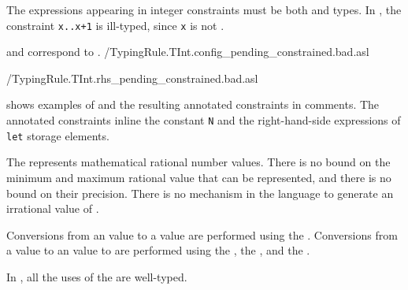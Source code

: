 The expressions appearing in integer constraints must be both
\symbolicallyevaluableterm{} and \constrainedintegerterm{} types.
%
In , the constraint
\verb|x..x+1| is ill-typed, since \texttt{x} is not \symbolicallyevaluableterm{}.

and 
correspond to .
{\typingtests/TypingRule.TInt.config_pending_constrained.bad.asl}

{\typingtests/TypingRule.TInt.rhs_pending_constrained.bad.asl}




 shows examples of \wellconstrainedintegertypesterm{}
and the resulting annotated constraints in comments.
The annotated constraints inline the constant \texttt{N} and the right-hand-side
expressions of \texttt{let} storage elements.



\hypertarget{realtypeterm}{}
The \emph{\realtypeterm{}} represents mathematical rational number values.
There is no bound on the minimum and maximum rational value that can be represented,
and there is no bound on their precision.
%
There is no mechanism in the language to generate an irrational value of \realtypeterm.

Conversions from an \integertypeterm{} value to a \realtypeterm{} value are performed
using the .
%
Conversions from a \realtypeterm{} value to an \integertypeterm{} value to are performed
using the , the , and the .

In , all the uses of the \realtypeterm{} are well-typed.

